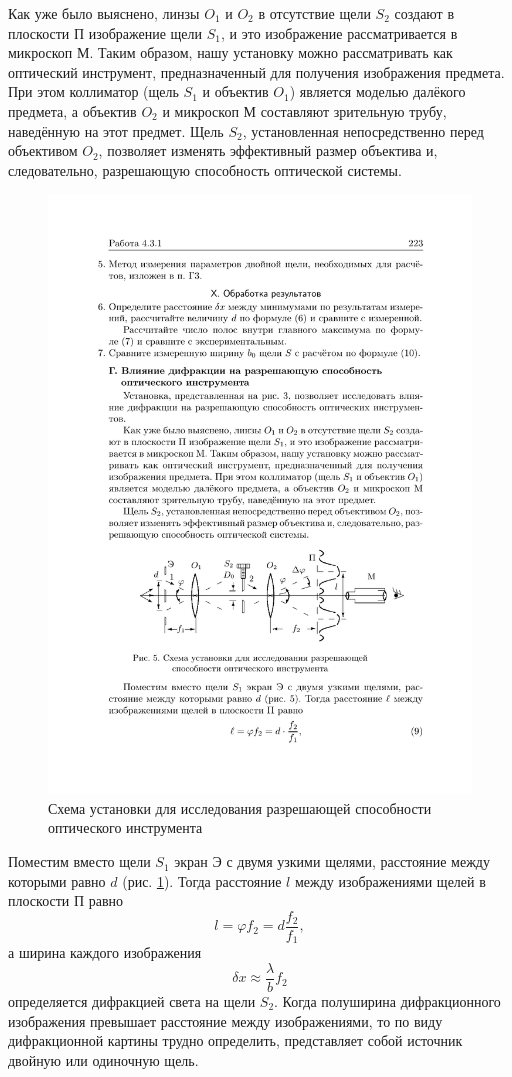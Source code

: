 \documentclass[a4paper, 12pt]{article}%
\begin{document}
 	Как уже было выяснено, линзы $O_1$ и $ O_2$ в отсутствие щели $S_2$ создают в плоскости П изображение щели $S_1$, и это изображение рассматривается в микроскоп М. Таким образом, нашу установку можно рассматривать как оптический инструмент, предназначенный для получения изображения предмета. При этом коллиматор (щель $S_1$ и объектив $O_1$) является моделью далёкого предмета, а объектив $O_2$ и микроскоп М составляют зрительную трубу, наведённую на этот предмет.
 	Щель $S_2$, установленная непосредственно перед объективом $O_2$, позволяет изменять эффективный размер объектива и, следовательно, разрешающую способность оптической системы.
 	
 	\begin{figure}[h!]
 		\centering
 		\includegraphics[width=0.8\linewidth]{d.pdf}
 		\caption{Схема установки для исследования разрешающей
 			способности оптического инструмента}
 		\label{labG}
 	\end{figure}
 	
 	Поместим вместо щели $S_1$ экран Э с двумя узкими щелями, расстояние между которыми равно $d$ (рис. \ref{labG}). Тогда расстояние $l$ между изображениями щелей в плоскости П равно
 	\begin{equation}
 		l = \varphi f_2 = d \dfrac{f_2}{f_1},
 	\end{equation}
 	а ширина каждого изображения
 	\begin{equation}
 		\delta x \approx \dfrac{\lambda}{b} f_2
 	\end{equation}
 	определяется дифракцией света на щели $S_2$. Когда полуширина дифракционного изображения превышает расстояние между изображениями, то по виду дифракционной картины трудно определить, представляет собой источник двойную или одиночную щель.
 	
\end{document}

